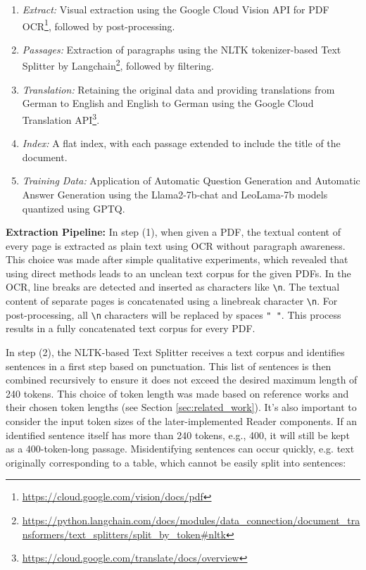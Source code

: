 \begin{enumerate}
    \item \textit{Extract:} Visual extraction using the Google Cloud Vision API for PDF OCR\footnote{\url{https://cloud.google.com/vision/docs/pdf}}, followed by post-processing.
    \item \textit{Passages:} Extraction of paragraphs using the NLTK tokenizer-based Text Splitter by Langchain\footnote{\url{https://python.langchain.com/docs/modules/data\_connection/document\_transformers/text\_splitters/split\_by\_token\#nltk}}, followed by filtering.
    \item \textit{Translation:} Retaining the original data and providing translations from German to English and English to German using the Google Cloud Translation API\footnote{\url{https://cloud.google.com/translate/docs/overview}}.
    \item \textit{Index:} A flat index, with each passage extended to include the title of the document.
    \item \textit{Training Data:} Application of Automatic Question Generation and Automatic Answer Generation using the Llama2-7b-chat and LeoLama-7b models quantized using GPTQ.
\end{enumerate}

\textbf{Extraction Pipeline:} In step (1), when given a PDF, the textual content of every page is extracted as plain text using OCR without paragraph awareness. This choice was made after simple qualitative experiments, which revealed that using direct methods leads to an unclean text corpus for the given PDFs. In the OCR, line breaks are detected and inserted as characters like \texttt{\textbackslash n}. The textual content of separate pages is concatenated using a linebreak character \texttt{\textbackslash n}. For post-processing, all \texttt{\textbackslash n} characters will be replaced by spaces \texttt{" "}. This process results in a fully concatenated text corpus for every PDF.

In step (2), the NLTK-based Text Splitter receives a text corpus and identifies sentences in a first step based on punctuation. This list of sentences is then combined recursively to ensure it does not exceed the desired maximum length of 240 tokens. This choice of token length was made based on reference works and their chosen token lengths (see Section \ref{sec:related_work}). It's also important to consider the input token sizes of the later-implemented Reader components. If an identified sentence itself has more than 240 tokens, e.g., 400, it will still be kept as a 400-token-long passage. Misidentifying sentences can occur quickly, e.g. text originally corresponding to a table, which cannot be easily split into sentences:

